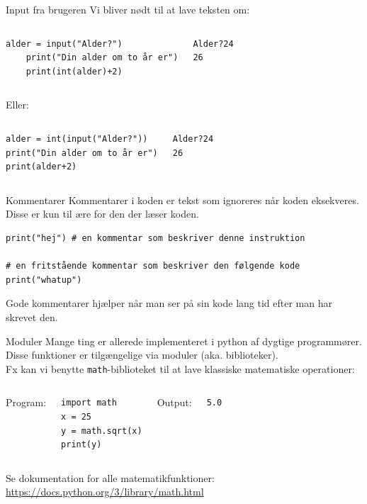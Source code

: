 \documentclass{beamer}
\begin{document}
\begin{frame}[fragile]{Input fra brugeren}
Vi bliver nødt til at lave teksten om:
\begin{columns}
	\begin{lstlisting}[style=python]
	alder = input("Alder?")
	print("Din alder om to år er")
	print(int(alder)+2)
	\end{lstlisting}
	\pause
	\begin{lstlisting}[style=python]
Alder?24
26
	\end{lstlisting}
\end{columns}
\pause
Eller:
\begin{columns}
	\begin{lstlisting}[style=python]
alder = int(input("Alder?"))
print("Din alder om to år er")
print(alder+2)
	\end{lstlisting}
	\pause
	\begin{lstlisting}[style=python]
Alder?24
26
	\end{lstlisting}
\end{columns}
\end{frame}

\begin{frame}[fragile]{Kommentarer}
Kommentarer i koden er tekst som ignoreres når koden eksekveres. Disse er kun til ære for den der læser koden.
\begin{lstlisting}[style=python]
print("hej") # en kommentar som beskriver denne instruktion

# en fritstående kommentar som beskriver den følgende kode
print("whatup")
\end{lstlisting}
Gode kommentarer hjælper når man ser på sin kode lang tid efter man har skrevet den.
\end{frame}

\begin{frame}[fragile]{Moduler}
Mange ting er allerede implementeret i python af dygtige programmører.
Disse funktioner er tilgængelige via moduler (aka. biblioteker). \\
Fx kan vi benytte \texttt{math}-biblioteket til at lave klassiske matematiske operationer:

\bigskip
\begin{columns}
Program:
\begin{lstlisting}[style=python]
import math
x = 25
y = math.sqrt(x)
print(y)
\end{lstlisting}
Output:
\begin{lstlisting}[style=python]
5.0
\end{lstlisting}
\end{columns}


Se dokumentation for alle matematikfunktioner:
\url{https://docs.python.org/3/library/math.html}
\end{frame}
\end{document}
